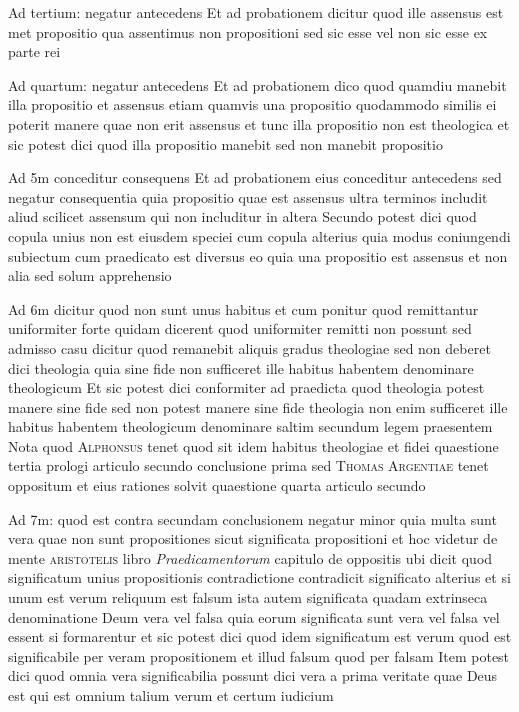 \documentclass[twoside, openright]{article}
\newcommand{\name}[1]{\textsc{#1}}
\newcommand{\worktitle}[1]{\textit{#1}}
\begin{document}
        \pstart
        Ad tertium: negatur antecedens Et ad probationem dicitur quod ille assensus est met propositio qua assentimus non propositioni sed sic esse vel non sic esse ex parte rei
        \pend
     
        \pstart
        Ad quartum: negatur antecedens Et ad probationem dico quod quamdiu manebit illa propositio et assensus etiam quamvis una propositio quodammodo similis ei poterit manere quae non erit assensus et tunc illa propositio non est theologica et sic potest dici quod illa propositio manebit sed non manebit propositio 
        \pend
     
        \pstart
        Ad 5m conceditur consequens Et ad probationem eius conceditur antecedens sed negatur consequentia quia propositio quae est assensus ultra terminos includit aliud scilicet assensum qui non includitur in altera Secundo potest dici quod copula unius non est eiusdem speciei cum copula alterius quia modus coniungendi subiectum cum praedicato est diversus eo quia una propositio est assensus et non alia sed solum apprehensio
        \pend
     
        \pstart
        Ad 6m dicitur quod non sunt unus habitus et cum ponitur quod remittantur uniformiter forte quidam dicerent quod uniformiter remitti non possunt sed admisso casu dicitur quod remanebit aliquis gradus theologiae sed non deberet dici theologia quia sine fide non sufficeret ille habitus habentem denominare theologicum Et sic potest dici  conformiter ad praedicta quod theologia potest manere sine fide sed non potest manere sine fide theologia non enim sufficeret ille habitus habentem theologicum denominare saltim secundum legem praesentem Nota quod \name{Alphonsus}\index[persons]{} tenet quod sit idem habitus theologiae et fidei quaestione tertia prologi articulo secundo conclusione prima sed \name{Thomas Argentiae} tenet oppositum et eius rationes solvit quaestione quarta articulo secundo
        \pend
     
        \pstart
        Ad 7m: quod est contra secundam conclusionem negatur minor quia multa sunt vera quae non sunt propositiones sicut significata propositioni et hoc videtur de mente \name{aristotelis} libro \worktitle{Praedicamentorum} capitulo de oppositis ubi dicit quod significatum unius propositionis contradictione contradicit significato alterius et si unum est verum reliquum est falsum ista autem significata quadam extrinseca denominatione Deum vera vel falsa quia eorum significata sunt vera vel falsa vel essent si formarentur et sic potest dici quod idem significatum est verum quod est significabile per veram propositionem et illud falsum quod per falsam Item potest dici quod omnia vera significabilia possunt dici vera a prima veritate quae Deus est qui est omnium talium verum et certum iudicium
        \pend
     
\end{document}
